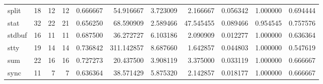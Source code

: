 \begin{tabular}{lrrrrrrrrrr}
split     &                                      18 &                 12 &                                12 &                                   0.666667 &                              54.916667 &                                     3.723009 &                          2.166667 &                                0.056342 &                           1.000000 &                                           0.694444 \\
stat      &                                      32 &                 22 &                                21 &                                   0.656250 &                              68.590909 &                                     2.589466 &                         47.545455 &                                0.089466 &                           0.954545 &                                           0.757576 \\
stdbuf    &                                      16 &                 11 &                                11 &                                   0.687500 &                              36.272727 &                                     6.103186 &                          2.090909 &                                0.012277 &                           1.000000 &                                           0.636364 \\
stty      &                                      19 &                 14 &                                14 &                                   0.736842 &                             311.142857 &                                     8.687660 &                          1.642857 &                                0.044803 &                           1.000000 &                                           0.547619 \\
sum       &                                      22 &                 16 &                                16 &                                   0.727273 &                              20.437500 &                                     3.908119 &                          3.375000 &                                0.033119 &                           1.000000 &                                           0.666667 \\
sync      &                                      11 &                  7 &                                 7 &                                   0.636364 &                              38.571429 &                                     5.875320 &                          2.142857 &                                0.018177 &                           1.000000 &                                           0.666667 \\

\end{tabular}
